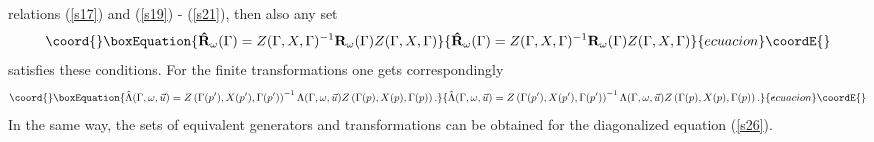 \documentclass[a4paper,a4paper]{article}
\begin{document}
relations (\ref{s17}) and (\ref{s19}) - (\ref{s21}), then also any set 
\begin{equation}\coord{}\boxEquation{
\mathbf{\hat{R}}_{\omega }(\Gamma )=Z(\Gamma ,X,\Gamma )^{-1}\mathbf{R}
_{\omega }(\Gamma )Z(\Gamma ,X,\Gamma )  \label{s75}
}{
\mathbf{\hat{R}}_{\omega }(\Gamma )=Z(\Gamma ,X,\Gamma )^{-1}\mathbf{R}
_{\omega }(\Gamma )Z(\Gamma ,X,\Gamma )  }{ecuacion}\coordE{}\end{equation}%
satisfies these conditions. For the finite transformations one gets
correspondingly 
\begin{equation}\coord{}\boxEquation{
\hat{\Lambda}(\Gamma ,\omega ,\vec{u})=Z\left( \Gamma (p^{\prime
}),X(p^{\prime }),\Gamma (p^{\prime })\right) ^{-1}\Lambda (\Gamma ,\omega ,
\vec{u})Z\left( \Gamma (p),X(p),\Gamma (p)\right) .  \label{s76}
}{
\hat{\Lambda}(\Gamma ,\omega ,\vec{u})=Z\left( \Gamma (p^{\prime
}),X(p^{\prime }),\Gamma (p^{\prime })\right) ^{-1}\Lambda (\Gamma ,\omega ,
\vec{u})Z\left( \Gamma (p),X(p),\Gamma (p)\right) .  }{ecuacion}\coordE{}\end{equation}%
In the same way, the sets of equivalent generators and transformations can
be obtained for the diagonalized equation (\ref{s26}).
\end{document}
